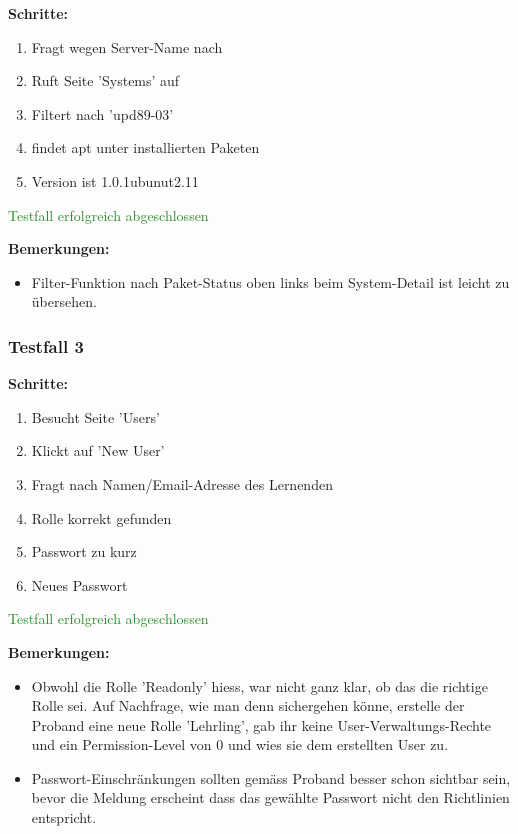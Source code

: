 {\textbf{Schritte:}

\begin{enumerate}
    \item Fragt wegen Server-Name nach
    \item Ruft Seite 'Systems' auf
    \item Filtert nach 'upd89-03'
    \item findet apt unter installierten Paketen
    \item Version ist 1.0.1ubunut2.11
\end{enumerate}

\textcolor{ForestGreen}{Testfall erfolgreich abgeschlossen}

\bigskip
\textbf{Bemerkungen:}

\begin{itemize}[noitemsep,nolistsep]
    \item Filter-Funktion nach Paket-Status oben links beim System-Detail ist leicht zu übersehen.
\end{itemize}


\subsubsection*{Testfall 3}

\textbf{Schritte:}

\begin{enumerate}
    \item Besucht Seite 'Users'
    \item Klickt auf 'New User'
    \item Fragt nach Namen/Email-Adresse des Lernenden
    \item Rolle korrekt gefunden
    \item Passwort zu kurz
    \item Neues Passwort
\end{enumerate}

\textcolor{ForestGreen}{Testfall erfolgreich abgeschlossen}

\bigskip
\textbf{Bemerkungen:}

\begin{itemize}[noitemsep,nolistsep]
    \item Obwohl die Rolle 'Readonly' hiess, war nicht ganz klar, ob das die richtige Rolle sei. Auf Nachfrage, wie man denn sichergehen könne, erstelle der Proband eine neue Rolle 'Lehrling', gab ihr keine User-Verwaltungs-Rechte und ein Permission-Level von 0 und wies sie dem erstellten User zu.
    \item Passwort-Einschränkungen sollten gemäss Proband besser schon sichtbar sein, bevor die Meldung erscheint dass das gewählte Passwort nicht den Richtlinien entspricht.
\end{itemize}


}
